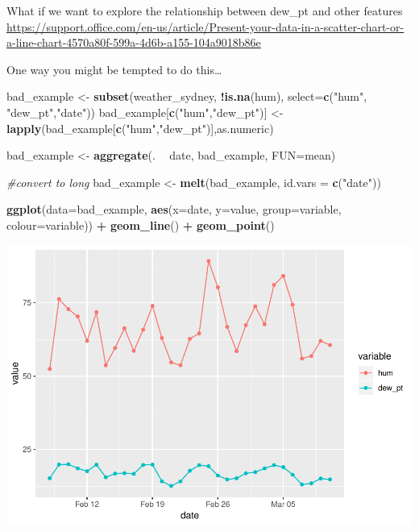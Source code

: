\documentclass[]{article}
\newenvironment{Shaded}{\begin{snugshade}}{\end{snugshade}}
\newcommand{\CommentTok}[1]{\textcolor[rgb]{0.56,0.35,0.01}{\textit{#1}}}
\newcommand{\DataTypeTok}[1]{\textcolor[rgb]{0.13,0.29,0.53}{#1}}
\newcommand{\KeywordTok}[1]{\textcolor[rgb]{0.13,0.29,0.53}{\textbf{#1}}}
\newcommand{\NormalTok}[1]{#1}
\newcommand{\OperatorTok}[1]{\textcolor[rgb]{0.81,0.36,0.00}{\textbf{#1}}}
\newcommand{\StringTok}[1]{\textcolor[rgb]{0.31,0.60,0.02}{#1}}
\begin{document}
What if we want to explore the relationship between dew\_pt and other
features
\url{https://support.office.com/en-us/article/Present-your-data-in-a-scatter-chart-or-a-line-chart-4570a80f-599a-4d6b-a155-104a9018b86e}

One way you might be tempted to do this\ldots{}

\begin{Shaded}
\begin{Highlighting}[]
\NormalTok{bad_example <-}\StringTok{ }\KeywordTok{subset}\NormalTok{(weather_sydney, }\OperatorTok{!}\KeywordTok{is.na}\NormalTok{(hum), }\DataTypeTok{select=}\KeywordTok{c}\NormalTok{(}\StringTok{"hum"}\NormalTok{, }\StringTok{"dew_pt"}\NormalTok{,}\StringTok{"date"}\NormalTok{))}
\NormalTok{bad_example[}\KeywordTok{c}\NormalTok{(}\StringTok{"hum"}\NormalTok{,}\StringTok{"dew_pt"}\NormalTok{)] <-}\StringTok{ }\KeywordTok{lapply}\NormalTok{(bad_example[}\KeywordTok{c}\NormalTok{(}\StringTok{"hum"}\NormalTok{,}\StringTok{"dew_pt"}\NormalTok{)],as.numeric)}

\NormalTok{bad_example <-}\StringTok{ }\KeywordTok{aggregate}\NormalTok{(. }\OperatorTok{~}\StringTok{ }\NormalTok{date, bad_example, }\DataTypeTok{FUN=}\NormalTok{mean)}

\CommentTok{#convert to long}
\NormalTok{bad_example <-}\StringTok{ }\KeywordTok{melt}\NormalTok{(bad_example, }\DataTypeTok{id.vars =} \KeywordTok{c}\NormalTok{(}\StringTok{"date"}\NormalTok{))}

\KeywordTok{ggplot}\NormalTok{(}\DataTypeTok{data=}\NormalTok{bad_example, }\KeywordTok{aes}\NormalTok{(}\DataTypeTok{x=}\NormalTok{date, }\DataTypeTok{y=}\NormalTok{value, }\DataTypeTok{group=}\NormalTok{variable, }\DataTypeTok{colour=}\NormalTok{variable)) }\OperatorTok{+}
\StringTok{    }\KeywordTok{geom_line}\NormalTok{() }\OperatorTok{+}
\StringTok{    }\KeywordTok{geom_point}\NormalTok{()}
\end{Highlighting}
\end{Shaded}

\includegraphics{AT2_template__medium__files/figure-latex/unnamed-chunk-8-1.pdf}
\end{document}
